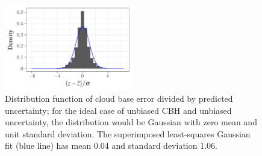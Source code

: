 \documentclass[essd,manuscript]{copernicus}\usepackage[]{graphicx}\usepackage[]{color}
\newenvironment{knitrout}{}{} %
\begin{document}
\begin{figure}
  \centering
\begin{knitrout}
\color{fgcolor}

{\centering \includegraphics[width=0.5\textwidth]{figure/method-combo-eval-pull-1} 

}



\end{knitrout}
  \caption{Distribution function of cloud base error divided by predicted
    uncertainty; for the ideal case of unbiased CBH and unbiased
    uncertainty, the distribution would be Gaussian with zero mean and unit
    standard deviation.  The superimposed least-squares Gaussian fit (blue line)
    has mean 0.04 and
    standard deviation 1.06.}
  \label{fig:pull}
\end{figure}


\end{document}
